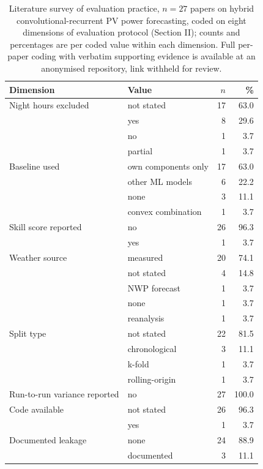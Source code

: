 \begin{table}[t]
  \centering
  \footnotesize
  \caption{Literature survey of evaluation practice, $n=27$ papers on
  hybrid convolutional-recurrent PV power forecasting, coded on eight
  dimensions of evaluation protocol (Section II); counts and
  percentages are per coded value within each dimension. Full
  per-paper coding with verbatim supporting evidence is available at
  an anonymised repository, link withheld for review.}
  \label{tab:T8}
  \begin{tabular}{llrr}
    \toprule
    Dimension & Value & $n$ & \% \\
    \midrule
    Night hours excluded & not stated & 17 & 63.0 \\
     & yes & 8 & 29.6 \\
     & no & 1 & 3.7 \\
     & partial & 1 & 3.7 \\
    \addlinespace
    Baseline used & own components only & 17 & 63.0 \\
     & other ML models & 6 & 22.2 \\
     & none & 3 & 11.1 \\
     & convex combination & 1 & 3.7 \\
    \addlinespace
    Skill score reported & no & 26 & 96.3 \\
     & yes & 1 & 3.7 \\
    \addlinespace
    Weather source & measured & 20 & 74.1 \\
     & not stated & 4 & 14.8 \\
     & NWP forecast & 1 & 3.7 \\
     & none & 1 & 3.7 \\
     & reanalysis & 1 & 3.7 \\
    \addlinespace
    Split type & not stated & 22 & 81.5 \\
     & chronological & 3 & 11.1 \\
     & k-fold & 1 & 3.7 \\
     & rolling-origin & 1 & 3.7 \\
    \addlinespace
    Run-to-run variance reported & no & 27 & 100.0 \\
    \addlinespace
    Code available & not stated & 26 & 96.3 \\
     & yes & 1 & 3.7 \\
    \addlinespace
    Documented leakage & none & 24 & 88.9 \\
     & documented & 3 & 11.1 \\
    \bottomrule
  \end{tabular}
\end{table}
